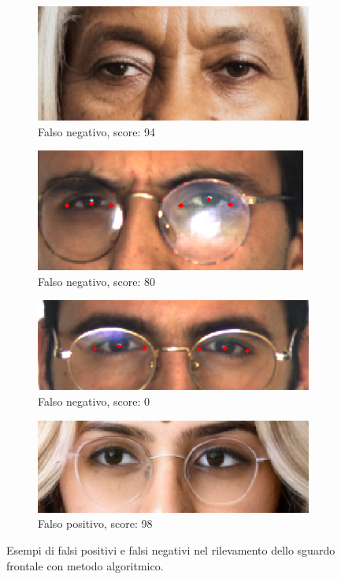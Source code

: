 \documentclass[12pt,a4paper,openright,twoside]{book}
\begin{document}
\begin{figure}[htbp]
    \centering
    \begin{subfigure}{0.49\textwidth}
        \centering
        \includegraphics[width=.7\linewidth]{figures/frontal-gaze-algo-false-negative-94-1.png}
        \caption{Falso negativo, score: 94}
        \label{fig:frontal_gaze_algo_weakness_1}
    \end{subfigure}
    \hfill
    \begin{subfigure}{0.49\textwidth}
        \centering
        \includegraphics[width=.7\linewidth]{figures/frontal-gaze-algo-false-negative-80-2.png}
        \caption{Falso negativo, score: 80}
        \label{fig:frontal_gaze_algo_weakness_2}
    \end{subfigure}
    \begin{subfigure}{0.49\textwidth}
        \centering
        \includegraphics[width=.7\linewidth]{figures/frontal-gaze-algo-false-negative-0-3.png}
        \caption{Falso negativo, score: 0}
        \label{fig:frontal_gaze_algo_weakness_3}
    \end{subfigure}
    \begin{subfigure}{0.49\textwidth}
        \centering
        \includegraphics[width=.7\linewidth]{figures/frontal-gaze-algo-false-positive-98-1.png}
        \caption{Falso positivo, score: 98}
        \label{fig:frontal_gaze_algo_weakness_4}
    \end{subfigure}
    \caption{Esempi di falsi positivi e falsi negativi nel rilevamento dello sguardo frontale con metodo algoritmico.}
    \label{fig:frontal_gaze_algo_weakness}
\end{figure}
\end{document}
